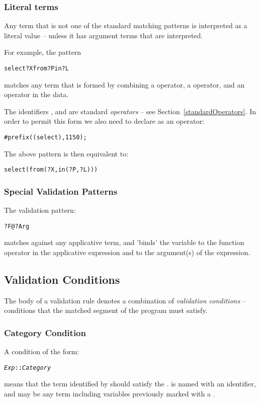 \subsubsection{Literal terms}
Any term that is not one of the standard matching patterns is interpreted as a literal value -- unless it has argument terms that are interpreted.

For example, the pattern
\begin{alltt}
select ?X from ?P in ?L
\end{alltt}
matches any term that is formed by combining a  operator, a  operator, and an  operator in the data.
\begin{aside}
The identifiers , and  are standard \emph{operators} -- see Section~\vref{standardOperators}. In order to permit this form we also need to declare  as an operator:
\begin{alltt}
#prefix((select),1150);
\end{alltt}
The above pattern is then equivalent to:
\begin{alltt}
select(from(?X,in(?P,?L)))
\end{alltt}
\end{aside}


\subsubsection{Special Validation Patterns}
The validation pattern:
\begin{alltt}
?F@?Arg
\end{alltt}
matches against any applicative term, and 'binds' the variable  to the function operator in the applicative expression and  to the argument(s) of the expression.

\subsection{Validation Conditions}
The body of a validation rule denotes a combination of \emph{validation conditions} -- conditions that the matched segment of the program must satisfy.

\subsubsection{Category Condition}
A condition of the form:
\begin{alltt}
\emph{Exp} :: \emph{Category}
\end{alltt}
means that the term identified by  should satisfy the .  is named with an identifier, and  may be any term including variables previously marked with a .

